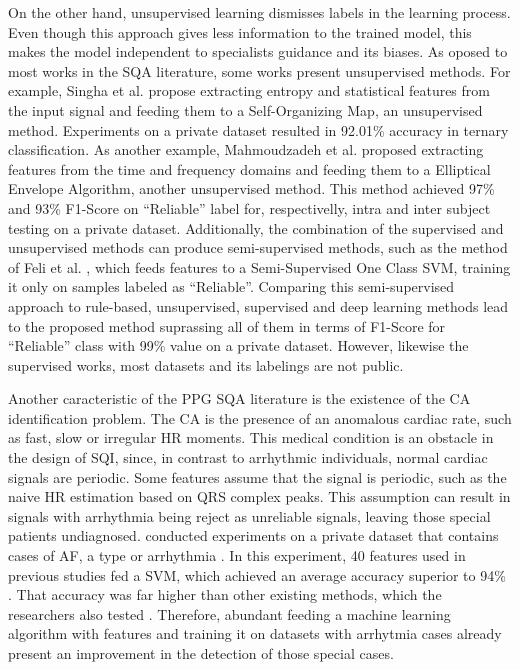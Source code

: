 On the other hand, unsupervised learning dismisses labels in the learning process. Even though this approach gives less information to the trained model, this makes the model independent to specialists guidance and its biases. As oposed to most works in the \gls{SQA} literature, some works present unsupervised methods. For example, Singha et al. \cite{ppg-sqa-4} propose extracting entropy and statistical features from the input signal and feeding them to a Self-Organizing Map, an unsupervised method. Experiments on a private dataset resulted in 92.01\% accuracy in ternary classification. As another example, Mahmoudzadeh et al. \cite{ppg-sqa-5} proposed extracting features from the time and frequency domains and feeding them to a Elliptical Envelope Algorithm, another unsupervised method. This method achieved 97\% and 93\% F1-Score on ``Reliable'' label for, respectivelly, intra and inter subject testing on a private dataset. Additionally, the combination of the supervised and unsupervised methods can produce semi-supervised methods, such as the method of Feli et al. \cite{ppg-sqa-6}, which feeds features to a Semi-Supervised One Class \gls{SVM}, training it only on samples labeled as ``Reliable''. Comparing this semi-supervised approach to rule-based, unsupervised, supervised and deep learning methods lead to the proposed method suprassing all of them in terms of F1-Score for ``Reliable'' class with 99\% value on a private dataset. However, likewise the supervised works, most datasets and its labelings are not public.
		
\cite{arrhythmia-1}		

Another caracteristic of the \gls{PPG} \gls{SQA} literature is the existence of the \gls{CA} identification problem. The \gls{CA} is the presence of an anomalous cardiac rate, such as fast, slow or irregular \gls{HR} moments. This medical condition is an obstacle in the design of \gls{SQI}, since, in contrast to arrhythmic individuals, normal cardiac signals are periodic. Some features assume that the signal is periodic, such as the naive \gls{HR} estimation based on QRS complex peaks. This assumption can result in signals with arrhythmia being reject as unreliable signals, leaving those special patients undiagnosed. \citeauthor{arrhythmia-2} conducted experiments on a private dataset that contains cases of \gls{AF}, a type or arrhythmia \cite{arrhythmia-2}. In this experiment, 40 features used in previous studies fed a \gls{SVM}, which achieved an average accuracy superior to 94\% \cite{arrhythmia-2}. That accuracy was far higher than other existing methods, which the researchers also tested \cite{arrhythmia-2}. Therefore, abundant feeding a machine learning algorithm with features and training it on datasets with arrhytmia cases already present an improvement in the detection of those special cases.

